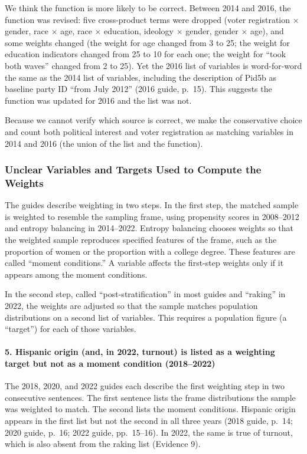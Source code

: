 \documentclass[12pt]{article}
\begin{document}

We think the function is more likely to be correct. Between 2014 and 2016, the function was revised: five cross-product terms were dropped (voter registration $\times$ gender, race $\times$ age, race $\times$ education, ideology $\times$ gender, gender $\times$ age), and some weights changed (the weight for age changed from 3 to 25; the weight for education indicators changed from 25 to 10 for each one; the weight for ``took both waves'' changed from 2 to 25). Yet the 2016 list of variables is word-for-word the same as the 2014 list of variables, including the description of Pid5b as baseline party ID ``from July 2012'' (2016 guide, p.~15). This suggests the function was updated for 2016 and the list was not.

Because we cannot verify which source is correct, we make the conservative choice and count both political interest and voter registration as matching variables in 2014 and 2016 (the union of the list and the function).

\subsubsection*{Unclear Variables and Targets Used to Compute the Weights}

The guides describe weighting in two steps. In the first step, the matched sample is weighted to resemble the sampling frame, using propensity scores in 2008--2012 and entropy balancing in 2014--2022. Entropy balancing chooses weights so that the weighted sample reproduces specified features of the frame, such as the proportion of women or the proportion with a college degree. These features are called ``moment conditions.'' A variable affects the first-step weights only if it appears among the moment conditions.

In the second step, called ``post-stratification'' in most guides and ``raking'' in 2022, the weights are adjusted so that the sample matches population distributions on a second list of variables. This requires a population figure (a ``target'') for each of those variables.

\paragraph*{5. Hispanic origin (and, in 2022, turnout) is listed as a weighting target but not as a moment condition (2018--2022)}
The 2018, 2020, and 2022 guides each describe the first weighting step in two consecutive sentences. The first sentence lists the frame distributions the sample was weighted to match. The second lists the moment conditions. Hispanic origin appears in the first list but not the second in all three years (2018 guide, p.~14; 2020 guide, p.~16; 2022 guide, pp.~15--16). In 2022, the same is true of turnout, which is also absent from the raking list (Evidence 9).
\end{document}
